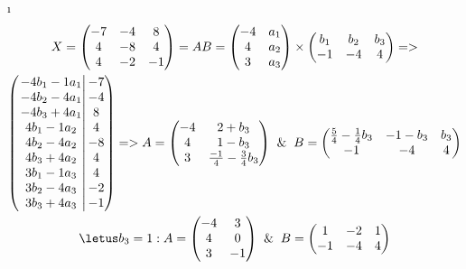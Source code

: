 \i \begin{gather*}
    X = \begin{pmatrix}
        -7 & -4 & 8\\
        4 & -8 & 4\\
        4 & -2 & -1
    \end{pmatrix} = AB = \begin{pmatrix}
        -4 & a_1\\
        4 & a_2\\
        3 & a_3
    \end{pmatrix} \times \begin{pmatrix}
        b_1 & b_2 & b_3\\
        -1 & -4 & 4
    \end{pmatrix} => \\
    \begin{pmatrix}
        \left.\begin{matrix}
            -4b_1 - 1a_1\\
            -4b_2 - 4a_1\\
            -4b_3 + 4a_1\\
            4b_1 - 1a_2\\
            4b_2 - 4a_2\\
            4b_3 + 4a_2\\
            3b_1 - 1a_3\\
            3b_2 - 4a_3\\
            3b_3 + 4a_3
        \end{matrix}\right|
        \begin{matrix}
            -7\\
            -4\\
            8\\
            4\\
            -8\\
            4\\
            4\\
            -2\\
            -1
        \end{matrix}
    \end{pmatrix} => 
    A = \begin{pmatrix}
        -4 & 2+b_3\\
        4 & 1-b_3\\
        3 & \frac{-1}{4}-\frac{3}{4}b_3
    \end{pmatrix} \And
    B = \begin{pmatrix}
        \frac{5}{4}-\frac{1}{4}b_3 & -1-b_3 & b_3\\
        -1 & -4 & 4
    \end{pmatrix}\\
    \letus b_3 = 1:A = \begin{pmatrix}
        -4 & 3\\
        4 & 0\\
        3 & -1
    \end{pmatrix} \And
    B = \begin{pmatrix}
        1 & -2 & 1\\
        -1 & -4 & 4
    \end{pmatrix}\\
\end{gather*}
